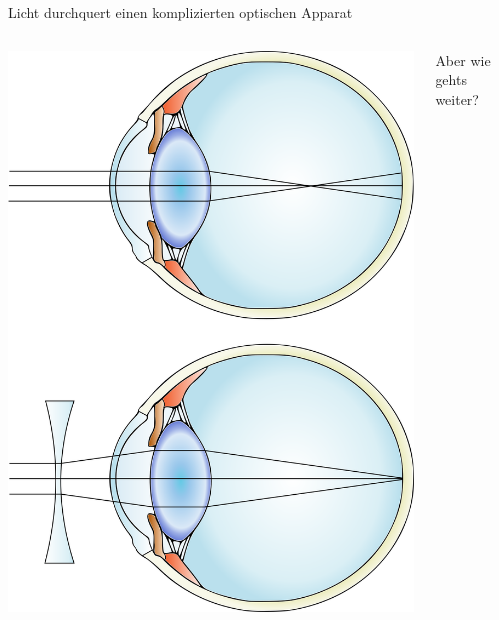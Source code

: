 \documentclass{beamer}
\begin{document}
\begin{frame}{Licht durchquert einen komplizierten optischen Apparat}

\begin{columns}[c]

\begin{column}{5cm}
\begin{center}
    \includegraphics[width=\textwidth]{myopia.png}
\end{center}

\end{column}

\begin{column}{5cm}


\pause

Aber wie gehts weiter?

\end{column}


\end{columns}

    
\end{frame}
\end{document}
